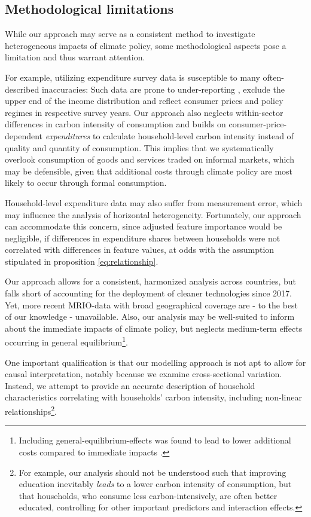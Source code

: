 \documentclass[12pt, a4paper]{article}
\begin{document}
\subsection{Methodological limitations}

While our approach may serve as a consistent method to investigate heterogeneous impacts of climate policy, some methodological aspects pose a limitation and thus warrant attention.

For example, utilizing expenditure survey data is susceptible to many often-described inaccuracies: Such data are prone to under-reporting \autocite{Meyer.2015}, exclude the upper end of the income distribution \autocite{Blanchet.2022} and reflect consumer prices and policy regimes in respective survey years. Our approach also neglects within-sector differences in carbon intensity of consumption and builds on consumer-price-dependent \textit{expenditures} to calculate household-level carbon intensity instead of quality and quantity of consumption. This implies that we systematically overlook consumption of goods and services traded on informal markets, which may be defensible, given that additional costs through climate policy are most likely to occur through formal consumption.

Household-level expenditure data may also suffer from measurement error, which may influence the analysis of horizontal heterogeneity. Fortunately, our approach can accommodate this concern, since adjusted feature importance would be negligible, if differences in expenditure shares between households were not correlated with differences in feature values, at odds with the assumption stipulated in proposition \ref{eq:relationship}.

Our approach allows for a consistent, harmonized analysis across countries, but falls short of accounting for the deployment of cleaner technologies since 2017. Yet, more recent MRIO-data with broad geographical coverage are - to the best of our knowledge - unavailable. Also, our analysis may be well-suited to inform about the immediate impacts of climate policy, but neglects medium-term effects occurring in general equilibrium\footnote{Including general-equilibrium-effects was found to lead to lower additional costs compared to immediate impacts \autocite{Ohlendorf.2021}.}. 

One important qualification is that our modelling approach is not apt to allow for causal interpretation, notably because we examine cross-sectional variation. Instead, we attempt to provide an accurate description of household characteristics correlating with households' carbon intensity, including non-linear relationships\footnote{For example, our analysis should not be understood such that improving education inevitably \textit{leads} to a lower carbon intensity of consumption, but that households, who consume less carbon-intensively, are often better educated, controlling for other important predictors and interaction effects.}.
\end{document}
